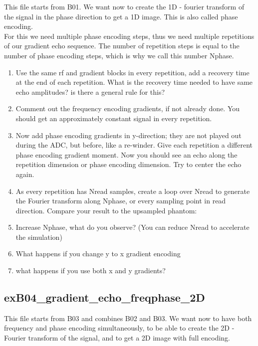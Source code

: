 \documentclass[a4paper,12pt]{extarticle}
\begin{document}
This file starts from B01. We want now to create the 1D - fourier transform of the signal in the phase direction to get a 1D image.
This is also called phase encoding. \\
For this we need multiple phase encoding steps, thus we need multiple repetitions of our gradient echo sequence. The number of repetition steps is equal to the number of phase encoding steps, which is why we call this number Nphase.
\begin{enumerate}
\item  Use the same rf and gradient blocks in every repetition, add a recovery time at the end of each repetition. What is the recovery time needed to have same echo amplitudes? is there a general rule for this? 
\item  Comment out the frequency encoding gradients, if not already done. You should get an approximately constant signal in every repetition.
\item Now add phase encoding gradients in y-direction; they are not played out during the ADC, but before, like a re-winder. Give each repetition a different phase encoding gradient moment. Now you should see an echo along the repetition dimension or phase encoding dimension. Try to center the echo again.

\item As every repetition has Nread samples, create a loop over Nread to generate the Fourier transform along Nphase, or every sampling point in read direction. Compare your result to the upsampled phantom:
    
\item Increase Nphase, what do you observe?  (You can reduce Nread to accelerate the simulation)

\item What happens if you change y to x gradient encoding
\item what happens if you use both x and y gradients?
\end{enumerate}

\subsection{exB04\_gradient\_echo\_freqphase\_2D}
This file starts from B03 and combines B02 and B03.
We want now to have both frequency and phase encoding simultaneously,
to be able to create the 2D - Fourier transform of the signal,
and to get a 2D image with full encoding.
\end{document}
